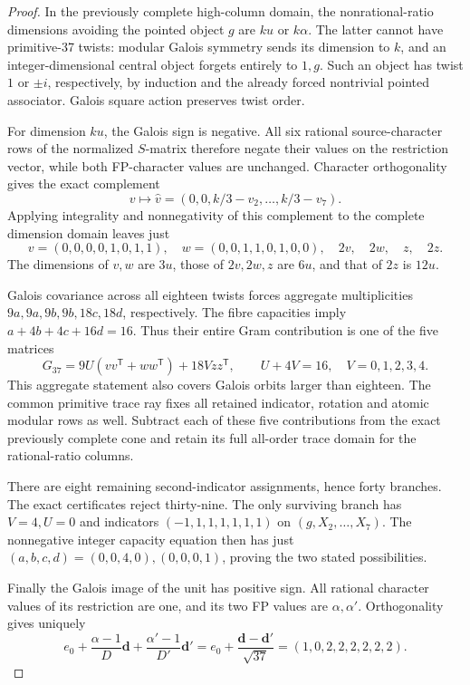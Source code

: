 \begin{proof}
In the previously complete high-column domain, the nonrational-ratio
dimensions avoiding the pointed object $g$ are $ku$ or $k\alpha$.
The latter cannot have primitive-37 twists: modular Galois symmetry
sends its dimension to $k$, and an integer-dimensional central object
forgets entirely to $1,g$. Such an object has twist $1$ or $\pm i$,
respectively, by induction and the already forced nontrivial pointed
associator. Galois square action preserves twist order.

For dimension $ku$, the Galois sign is negative. All six rational
source-character rows of the normalized $S$-matrix therefore negate
their values on the restriction vector, while both FP-character values
are unchanged. Character orthogonality gives the exact complement
\[
 v\longmapsto\widehat v=(0,0,k/3-v_2,\ldots,k/3-v_7).
\]
Applying integrality and nonnegativity of this complement to the
complete dimension domain leaves just
\[
 v=(0,0,0,0,1,0,1,1),\quad
 w=(0,0,1,1,0,1,0,0),\quad 2v,\quad2w,\quad z,\quad2z.
\]
The dimensions of $v,w$ are $3u$, those of $2v,2w,z$ are $6u$,
and that of $2z$ is $12u$.

Galois covariance across all eighteen twists forces aggregate
multiplicities $9a,9a,9b,9b,18c,18d$, respectively. The fibre
capacities imply $a+4b+4c+16d=16$. Thus their entire Gram contribution
is one of the five matrices
\[
 G_{37}=9U(vv^{\mathsf T}+ww^{\mathsf T})+18Vzz^{\mathsf T},
 \qquad U+4V=16,\quad V=0,1,2,3,4.
\]
This aggregate statement also covers Galois orbits larger than
eighteen. The common primitive trace ray fixes all retained indicator,
rotation and atomic modular rows as well. Subtract each of these five
contributions from the exact previously complete cone and retain its
full all-order trace domain for the rational-ratio columns.

There are eight remaining second-indicator assignments, hence forty
branches. The exact certificates reject thirty-nine. The only surviving
branch has $V=4,U=0$ and indicators
$(-1,1,1,1,1,1,1)$ on $(g,X_2,\ldots,X_7)$.
The nonnegative integer capacity equation then has just
$(a,b,c,d)=(0,0,4,0),(0,0,0,1)$, proving the two stated possibilities.

Finally the Galois image of the unit has positive sign. All rational
character values of its restriction are one, and its two FP values are
$\alpha,\alpha'$. Orthogonality gives uniquely
\[
 e_0+\frac{\alpha-1}{D}\mathbf d
       +\frac{\alpha'-1}{D'}\mathbf d'
   =e_0+\frac{\mathbf d-\mathbf d'}{\sqrt{37}}
   =(1,0,2,2,2,2,2,2).
\]
\end{proof}

